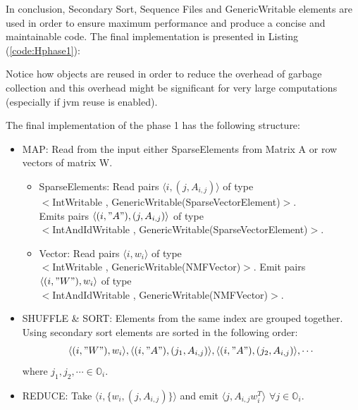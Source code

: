 \documentclass[a4paper,12pt]{article}
\begin{document}
In conclusion, Secondary Sort, Sequence Files and GenericWritable elements are used in order to ensure maximum performance and produce a concise and maintainable code.
The final implementation is presented in Listing (\ref{code:Hphase1}):
 
Notice how objects are reused in order to reduce the overhead of garbage collection and this overhead might be significant for very large computations (especially if jvm reuse is enabled).

The final implementation of the phase 1 has the following structure:

        \begin{itemize}
        
          \item MAP: Read from the input either SparseElements from Matrix A  or  row vectors of matrix W.
          \begin{itemize}
          
          \item SparseElements: Read pairs $\langle i,( j, A_{i,j}) \rangle $ of type \\
          $<$IntWritable , GenericWritable(SparseVectorElement)$>$.
          \\
          Emits pairs $\langle (i,"A"),( j, A_{i,j}) \rangle $ of type \\ 
          $<$IntAndIdWritable , GenericWritable(SparseVectorElement)$>$.
          
          \item Vector: Read pairs $\langle i, w_i \rangle$ of type \\
          $<$IntWritable , GenericWritable(NMFVector)$>$.
          Emit pairs $\langle (i,"W"), w_i \rangle$ of type \\
          $<$IntAndIdWritable , GenericWritable(NMFVector)$>$.          
          \end{itemize}

		\item SHUFFLE \& SORT: Elements from the same index are grouped together.
		Using secondary sort elements are sorted in the following order: $$\langle (i,"W"), w_i \rangle,\langle (i,"A"),( j_1, A_{i,j}) \rangle , \langle (i,"A"),( j_2, A_{i,j}) \rangle , \cdots$$ where $j_1,j_2,\cdots \in \mathbb{O}_i $.
			
         \item REDUCE: Take  $ \langle i, \{w_{i}, (j, A_{i,j}) \}
           \rangle$ and emit  $ \langle j, A_{i,j}  w_{i}^{T}
           \rangle$ $\forall j \in \mathbb{O}_i $.

         \end{itemize}
\end{document}
